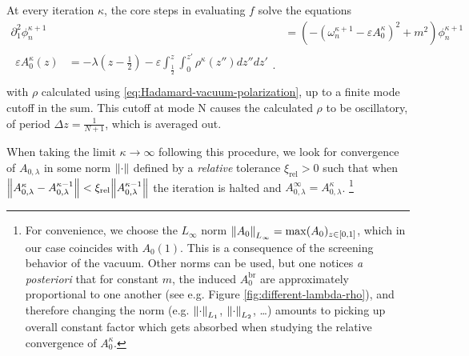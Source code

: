 At every iteration $\kappa$, the core steps in evaluating $f$ solve the equations
\begin{subequations}
\begin{align}
	\partial_1^2 \phi^{\kappa+1}_n &=
	\left( - (\omega^{\kappa+1}_n - \varepsilon A^{\kappa}_0)^2 + m^2 \right) \phi^{\kappa+1}_n
	\label{eq:iterative-TIKGE}\\
	\begin{split}
		\varepsilon A_0^{\kappa}(z) &= -\lambda\left( z-\frac{1}{2} \right)  - \varepsilon\int_{\frac{1}{2}}^{z} \int_{0}^{z'} \rho^{\kappa}(z'')  dz'' dz'\\
	\end{split}
	\label{eq:potential-at-step-kappa}
.
\end{align}
\end{subequations}
with $\rho$ calculated using \eqref{eq:Hadamard-vacuum-polarization}, up to a finite mode cutoff in the sum. This cutoff at mode N causes the calculated $\rho$ to be oscillatory, of period $\Delta z = \frac{1}{N+1}$, which is averaged out. 

When taking the limit $\kappa \to \infty$ following this procedure, we look for convergence of $A_{0, \lambda}$ in some norm $\norm{\cdot}$ defined by a \textit{relative} tolerance $\xi_\text{rel}>0$ such that when $\norm{A_{0, \lambda}^\kappa-A_{0, \lambda}^{\kappa-1}} < \xi_\text{rel} \norm{A_{0, \lambda}^{\kappa -1}}$ the iteration is halted and $A_{0, \lambda}^\infty =A_{0, \lambda}^\kappa $. 
\footnote{For convenience, we choose the $L_{\infty}$ norm $\norm{A_0}_{L_\infty} = \max(A_0)_{z\in [0,1]}$, which in our case coincides with $A_0(1)$. This is a consequence of the screening behavior of the vacuum. Other norms can be used, but one notices \textit{a posteriori} that for constant $m$, the induced $A_0^\text{br}$ are approximately proportional to one another (see e.g. Figure \ref{fig:different-lambda-rho}), and therefore changing the norm (e.g. $\norm{\cdot}_{L_1}$, $\norm{\cdot}_{L_2}$, \ldots) amounts to picking up overall constant factor which gets absorbed when studying the relative convergence of $A_0^\kappa$. 
} 

